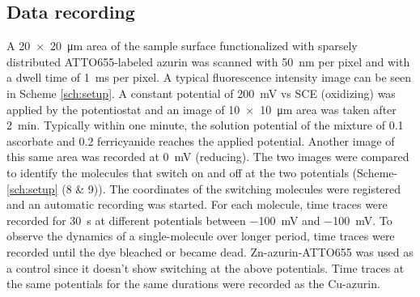 \documentclass[journal=jacsat,manuscript=article]{achemso}
\begin{document}
\subsection{Data recording}
A \SI[product-units=repeat]{20x20}{\um} area of the sample surface functionalized with sparsely distributed ATTO655-labeled azurin was scanned with \SI{50}{\nm} per pixel and with a dwell time of \SI{1}{\ms} per pixel.
A typical fluorescence intensity image can be seen in Scheme \ref{sch:setup}.
A constant potential of \SI{200}{\mV} vs SCE (oxidizing) was applied by the potentiostat and an image of \SI[product-units=repeat]{10x10}{\um} area was taken after \SI{2}{\minute}.
Typically within one minute, the solution potential of the mixture of \SI{0.1}{\mM} ascorbate and \SI{0.2}{\mM} ferricyanide reaches the applied potential.
Another image of this same area was recorded at \SI{0}{\mV} (reducing).
The two images were compared to identify the molecules that switch on and off at the two potentials (Scheme-\ref{sch:setup} (8 \& 9)).
The coordinates of the switching molecules were registered and an automatic recording was started.
For each molecule, time traces were recorded for \SI{30}{\s} at different potentials between \SI{-100}{\mV} and \SI{-100}{\mV}.
To observe the dynamics of a single-molecule over longer period, time traces were recorded until the dye  bleached or became dead.
Zn-azurin-ATTO655 was used as a control since it doesn't show switching at the above potentials.
Time traces at the same potentials for the same durations were recorded as the Cu-azurin.
\end{document}
